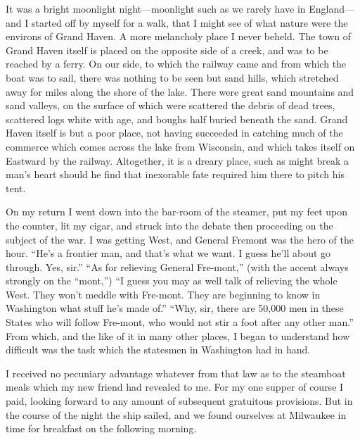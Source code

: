 It was a bright moonlight night---moonlight such as we rarely have
in England---and I started off by myself for a walk, that I might
see of what nature were the environs of Grand Haven.  A more
melancholy place I never beheld.  The town of Grand Haven itself is
placed on the opposite side of a creek, and was to be reached by a
ferry.  On our side, to which the railway came and from which the
boat was to sail, there was nothing to be seen but sand hills,
which stretched away for miles along the shore of the lake.  There
were great sand mountains and sand valleys, on the surface of which
were scattered the debris of dead trees, scattered logs white with
age, and boughs half buried beneath the sand.  Grand Haven itself
is but a poor place, not having succeeded in catching much of the
commerce which comes across the lake from Wisconsin, and which
takes itself on Eastward by the railway.  Altogether, it is a
dreary place, such as might break a man's heart should he find that
inexorable fate required him there to pitch his tent.

On my return I went down into the bar-room of the steamer, put my
feet upon the counter, lit my cigar, and struck into the debate
then proceeding on the subject of the war.  I was getting West, and
General Fremont was the hero of the hour.  ``He's a frontier man,
and that's what we want.  I guess he'll about go through.  Yes,
sir.''  ``As for relieving General Fre-mont,'' (with the accent always
strongly on the ``mont,'') ``I guess you may as well talk of relieving
the whole West.  They won't meddle with Fre-mont.  They are
beginning to know in Washington what stuff he's made of.''  ``Why,
sir, there are 50,000 men in these States who will follow Fre-mont,
who would not stir a foot after any other man.''  From which, and
the like of it in many other places, I began to understand how
difficult was the task which the statesmen in Washington had in
hand.

I received no pecuniary advantage whatever from that law as to the
steamboat meals which my new friend had revealed to me.  For my one
supper of course I paid, looking forward to any amount of
subsequent gratuitous provisions.  But in the course of the night
the ship sailed, and we found ourselves at Milwaukee in time for
breakfast on the following morning.

